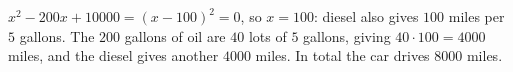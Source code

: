 $x^2-200x+10000=(x-100)^2=0$, so $x=100$: diesel also gives $100$ miles per $5$ gallons. The $200$ gallons of oil are $40$ lots of $5$ gallons, giving $40\cdot100=4000$ miles, and the diesel gives another $4000$ miles. In total the car drives $\boxed{8000}$ miles.

